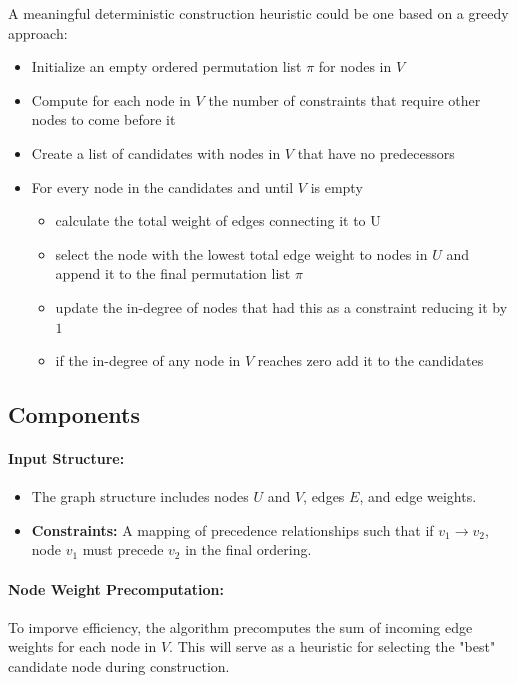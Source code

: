 \documentclass{article}
\begin{document}
A meaningful deterministic construction heuristic could be one based on a greedy approach:
\begin{itemize}
    \item Initialize an empty ordered permutation list $\pi$ for nodes in $V$
    \item Compute for each node in $V$ the number of constraints that require other nodes to come before it
    \item Create a list of candidates with nodes in $V$ that have no predecessors
    \item For every node in the candidates and until $V$ is empty
    \begin{itemize}
        \item calculate the total weight of edges connecting it to U
        \item select the node with the lowest total edge weight to nodes in $U$ and append it to the final permutation list $\pi$
        \item  update the in-degree of nodes that had this as a constraint reducing it by $1$
        \item if the in-degree of any node in $V$ reaches zero add it to the candidates
        
    \end{itemize}
\end{itemize}

\subsection*{Components}

\paragraph{Input Structure:}
\begin{itemize}
    \item The graph structure includes nodes \( U \) and \( V \), edges \( E \), and edge weights.
    \item \textbf{Constraints:} A mapping of precedence relationships such that if \( v_1 \to v_2 \), node \( v_1 \) must precede \( v_2 \) in the final ordering.
\end{itemize}

\paragraph{Node Weight Precomputation:}
To imporve efficiency, the algorithm precomputes the sum of incoming edge weights for each node in \( V \). This will serve as a heuristic for selecting the "best" candidate node during construction.
\end{document}
